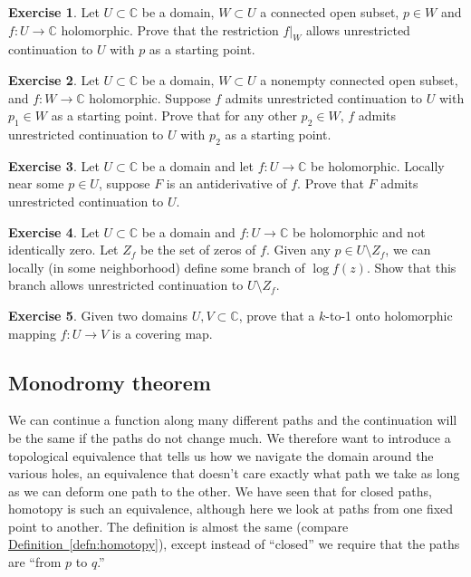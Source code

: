 \documentclass[12pt,openany]{book}
\newcommand{\C}{{\mathbb{C}}}
\newcommand{\myquote}[1]{``#1''}
\theoremstyle{plain}
\theoremstyle{remark}
\theoremstyle{definition}
\newenvironment{exbox}{%
    \def\FrameCommand{\vrule width 1pt \relax\hspace{10pt}}%
    \MakeFramed{\advance\hsize-\width\FrameRestore}%
}{%
    \endMakeFramed
}
\theoremstyle{exercise}
\newtheorem{exercise}{Exercise}[section]
\theoremstyle{example}
\newcommand{\defnref}[1]{\hyperref[#1]{Definition~\ref*{#1}}}
\begin{document}
\begin{exbox}
\begin{exercise}
Let $U \subset \C$ be a domain, $W \subset U$ a connected open subset,
$p \in W$ and $f \colon U \to \C$ holomorphic.  Prove that the restriction
$f|_W$ allows unrestricted continuation to $U$ with $p$ as a starting point.
\end{exercise}

\begin{exercise}%
\label{exercise:startingpointcont}
Let $U \subset \C$ be a domain, $W \subset U$ a nonempty connected open subset,
and $f \colon W \to \C$ holomorphic.  Suppose $f$ admits unrestricted
continuation to $U$ with $p_1 \in W$ as a starting point.  Prove
that for any other $p_2 \in W$, $f$ admits unrestricted continuation
to $U$ with $p_2$ as a starting point.
\end{exercise}

\begin{exercise}
Let $U \subset \C$ be a domain and let
$f \colon U \to \C$ be holomorphic.  Locally near some $p \in U$,
suppose $F$ is an antiderivative of $f$.  Prove that $F$ admits unrestricted
continuation to $U$.
\end{exercise}

\begin{exercise}
Let $U \subset \C$ be a domain and $f \colon U \to \C$ be holomorphic and
not identically zero.  Let $Z_f$ be the set of zeros of $f$.  Given any $p
\in U \setminus Z_f$, we can locally (in some neighborhood) define some branch of $\log f(z)$.
Show that this branch allows unrestricted continuation to $U \setminus Z_f$.
\end{exercise}

\begin{exercise}
Given two domains $U,V \subset \C$,
prove that a $k$-to-1 onto holomorphic mapping $f \colon U \to V$ is a covering map.
\end{exercise}
\end{exbox}

\subsection{Monodromy theorem}

We can continue a function along many different paths and the continuation
will be the same if the paths do not change much.  We therefore want to
introduce a topological equivalence that tells us how we navigate the domain
around the various holes, an equivalence that doesn't care exactly what
path we take as long as we can deform one path to the other.
We have seen that for closed paths, homotopy is such an equivalence, although
here we look at paths from one fixed point to another.  The definition
is almost the same (compare \defnref{defn:homotopy}), except instead of
\myquote{closed} we require that the paths
are \myquote{from $p$ to $q$.}
\end{document}
